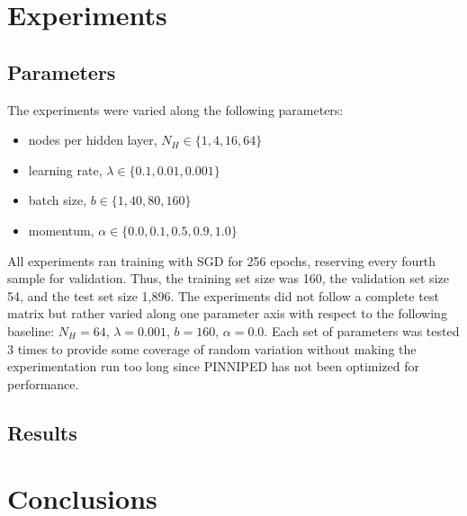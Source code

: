 \documentclass[10pt,epsf]{article}
\begin{document}
\section{Experiments}{
  \subsection{Parameters}{
    The experiments were varied along the following parameters:
    \begin{itemize}
    \item{nodes per hidden layer, $N_H \in \{1, 4, 16, 64\}$}
    \item{learning rate, $\lambda \in \{0.1, 0.01, 0.001\}$}
    \item{batch size, $b \in \{1, 40, 80, 160\}$}
    \item{momentum, $\alpha \in \{0.0, 0.1, 0.5, 0.9, 1.0\}$}
    \end{itemize}
    All experiments ran training with SGD for 256 epochs, reserving every fourth sample for validation.
    Thus, the training set size was 160, the validation set size 54, and the test set size 1,896.
    The experiments did not follow a complete test matrix but rather varied along one parameter axis
    with respect to the following baseline: $N_H = 64$, $\lambda = 0.001$, $b = 160$, $\alpha = 0.0$.
    Each set of parameters was tested 3 times to provide some coverage of random variation without
    making the experimentation run too long since PINNIPED has not been optimized for performance.
  }
  \subsection{Results}{
  }
}
\section{Conclusions}{
}

\printbibliography
\end{document}
